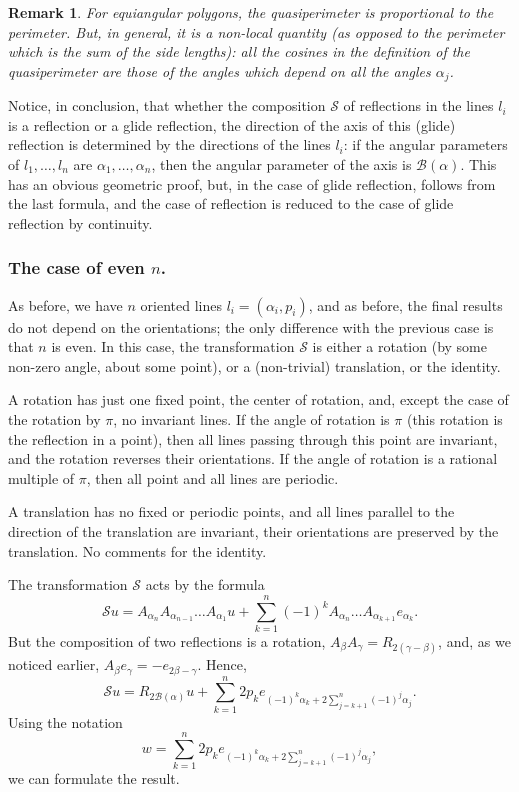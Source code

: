 \documentclass[12pt]{article}
\newtheorem{remark}[lemma]{Remark}
\newcommand{\B}{\mathcal{B}}
\begin{document}
\begin{remark}
{\rm 
For equiangular polygons, the quasiperimeter is proportional to the perimeter. But, in general, it is a non-local quantity (as opposed to the perimeter which is the sum of the side lengths): all the cosines in the definition of the quasiperimeter are those of the angles which depend on all the angles $\alpha_j$.
}
\end{remark}

Notice, in conclusion, that whether the composition $\mathcal S$ of reflections in the lines $l_i$ is a reflection or a glide reflection, the direction of the axis of this (glide) reflection is determined by the directions of the lines $l_i$: if the angular parameters of $l_1,\dots,l_n$ are $\alpha_1,\dots,\alpha_n$, then the angular parameter of the axis is $\B(\alpha)$. This has an obvious geometric proof, but, in the case of glide reflection, follows from the last formula, and the case of reflection is reduced to the case of glide reflection by continuity. 

\subsubsection{The case of even $n$.}\label{evenn}
As before, we have $n$ oriented lines $l_i=(\alpha_i,p_i)$, and as before, the final results do not depend on the orientations; the only difference with the previous case is that $n$ is even. In this case, the transformation $\mathcal S$ is either a rotation (by some non-zero angle, about some point), or a (non-trivial) translation, or the identity. 

A rotation has just one fixed point, the center of rotation, and, except the case of the rotation by $\pi$, no invariant lines. If the angle of rotation is $\pi$ (this rotation is the reflection in a point), then all lines passing through this point are invariant, and the rotation reverses their orientations. If the angle of rotation is a rational multiple of $\pi$, then all point and all lines are periodic. 

A translation has no fixed or periodic points, and all lines parallel to the direction of the translation are invariant, their orientations are preserved by the translation. 
No comments for the identity.

The transformation $\mathcal S$ acts by the formula
$$
{\mathcal S}u=A_{\alpha_n}A_{\alpha_{n-1}}\dots A_{\alpha_1}u+\sum_{k=1}^n(-1)^kA_{\alpha_n}\dots A_{\alpha_{k+1}}e_{\alpha_k}.
$$
But the composition of two reflections is a rotation, $A_\beta A_\gamma=R_{2(\gamma-\beta)}$, and, as we noticed earlier, $A_\beta e_\gamma=-e_{2\beta-\gamma}$. Hence,
$$
{\mathcal S}u=R_{2{\mathcal B}(\alpha)}u+\sum_{k=1}^n2p_ke_{(-1)^k\alpha_k+2\sum_{j=k+1}^n(-1)^j\alpha_j}.
$$
Using the notation
$$
w=\sum_{k=1}^n2p_ke_{(-1)^k\alpha_k+2\sum_{j=k+1}^n(-1)^j\alpha_j},
$$
we can formulate the result.
\end{document}
